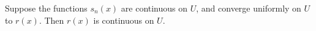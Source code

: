 Suppose the functions $s_n(x)$ are continuous on $U$, and converge uniformly on $U$ to $r(x)$. Then $r(x)$ is continuous on $U$.
